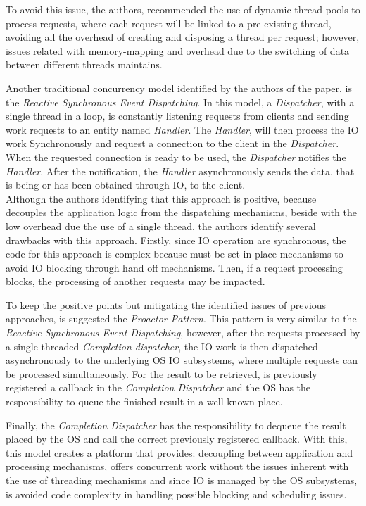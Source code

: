 To avoid this issue, the authors, recommended the use of dynamic thread pools to process requests, where each request will be linked to a pre-existing thread, avoiding all the overhead of creating and disposing a thread per request;
however, issues related with memory-mapping and overhead due to the switching of data between different threads maintains. 

Another traditional concurrency model identified by the authors of the paper, is the \textit{Reactive Synchronous Event Dispatching}. In this model, a \textit{Dispatcher}, with a single thread in a loop, is constantly listening requests from clients and sending work requests to an entity named \textit{Handler}. 
The \textit{Handler}, will then process the IO work Synchronously and request a connection to the client in the \textit{Dispatcher}. When the requested connection is ready to be used, the \textit{Dispatcher} notifies the \textit{Handler}. After the notification, the \textit{Handler} asynchronously sends the data, that is being or has been obtained through IO, to the client.\\
Although the authors identifying that this approach is positive, because decouples the application logic from the dispatching mechanisms, beside with the low overhead due the use of a single thread, the authors identify several drawbacks with this approach. 
Firstly, since IO operation are synchronous, the code for this approach is complex because must be set in place mechanisms to avoid IO blocking through hand off mechanisms. 
Then, if a request processing blocks, the processing of another requests may be impacted. 

To keep the positive points but mitigating the identified issues of previous approaches, is suggested the \textit{Proactor Pattern}. 
This pattern is very similar to the \textit{Reactive Synchronous Event Dispatching}, however, after the requests processed by a single threaded \textit{Completion dispatcher}, 
the IO work is then dispatched asynchronously to the underlying OS IO subsystems, where multiple requests can be processed simultaneously. 
For the result to be retrieved, is previously registered a callback in the \textit{Completion Dispatcher} and the OS has the responsibility to queue the finished result in a well known place. 

Finally, the \textit{Completion Dispatcher} has the responsibility to dequeue the result placed by the OS and call the correct previously registered callback. 
With this, this model creates a platform that provides: decoupling between application and processing mechanisms,
offers concurrent work without the issues inherent with the use of threading mechanisms and since IO is managed by the OS subsystems, is avoided code complexity in handling possible blocking and scheduling issues.  

